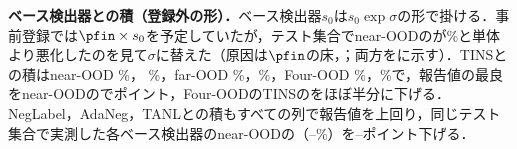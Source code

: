 \textbf{ベース検出器との積（登録外の形）．}ベース検出器$s_0$は$s_0\exp\sigma$の形で掛ける．事前登録では$\pfin\times s_0$を予定していたが，テスト集合でnear-OODの\FPR{}が\NPfNearFpr\%と単体より悪化したのを見て$\sigma$に替えた（原因は$\pfin$の床，；両方をに示す）．TINSとの積はnear-OOD \AUC{} \NNearAuroc\%，\FPR{} \NNearFpr\%，far-OOD \NFarAuroc\%，\NFarFpr\%，Four-OOD \NFourAuroc\%，\NFourFpr\%で，報告値の最良をnear-OODの\FPR{}で\NGapNearFpr{}ポイント，Four-OODのTINSの\FPR{}をほぼ半分に下げる．NegLabel，AdaNeg，TANLとの積もすべての列で報告値を上回り，同じテスト集合で実測した各ベース検出器のnear-OODの\FPR{}（\NMeasTinsNearFpr{}--\NMeasNeglabelNearFpr\%）を\NBaseTanlNearGainFpr{}--\NBaseNeglabelNearGainFpr{}ポイント下げる．

\begin{table}[t]
\centering
\caption{OpenOOD v1.5 ImageNet-1KとFour-OOD（[\%]）．$\dagger$は原論文の報告値（近／遠の平均は本稿で計算）．実測値は同じテスト集合での値（到着順の平均，）．本手法は抽出6通りの平均（$\times$ベース検出器の行は順序の平均も取る）．\textcolor{sotacol}{$\bigstar$}は列の最良値，\colorbox{upd}{青}は比較手法のすべてを上回る値，括弧の行は最良の比較手法との差（正は本手法が良い）．}
\label{tab:main}
\vspace{0.5mm}

\end{table}

